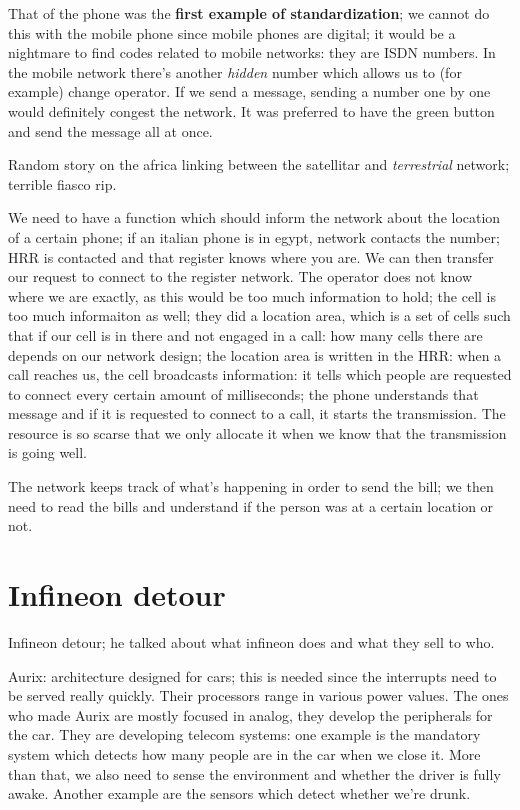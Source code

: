 \documentclass[a4paper, 12pt]{book}
\begin{document}
That of the phone was the \textbf{first example of standardization}; we cannot do this with the mobile phone since mobile phones are digital; it would be a nightmare to find codes related to mobile networks: they are ISDN numbers. In the mobile network there's another \textit{hidden} number which allows us to (for example) change operator.
If we send a message, sending a number one by one would definitely congest the network. It was preferred to have the green button and send the message all at once.

\begin{greenbar}
Random story on the africa linking between the satellitar and \textit{terrestrial} network; terrible fiasco rip.
\end{greenbar}

We need to have a function which should inform the network about the location of a certain phone; if an italian phone is in egypt, network contacts the number; HRR is contacted and that register knows where you are.
We can then transfer our request to connect to the register network.
The operator does not know where we are exactly, as this would be too much information to hold; the cell is too much informaiton as well; they did a location area, which is a set of cells such that if our cell is in there and not engaged in a call: how many cells there are depends on our network design; the location area is written in the HRR: when a call reaches us, the cell broadcasts information: it tells which people are requested to connect every certain amount of milliseconds; the phone understands that message and if it is requested to connect to a call, it starts the transmission. The resource is so scarse that we only allocate it when we know that the transmission is going well.

\begin{greenbar}
The network keeps track of what's happening in order to send the bill; we then need to read the bills and understand if the person was at a certain location or not.
\end{greenbar}

\section{Infineon detour}

Infineon detour; he talked about what infineon does and what they sell to who.

Aurix: architecture designed for cars; this is needed since the interrupts need to be served really quickly. Their processors range in various power values. The ones who made Aurix are mostly focused in analog, they develop the peripherals for the car.
They are developing telecom systems: one example is the mandatory system which detects how many people are in the car when we close it. More than that, we also need to sense the environment and whether the driver is fully awake.
Another example are the sensors which detect whether we're drunk.
\end{document}
